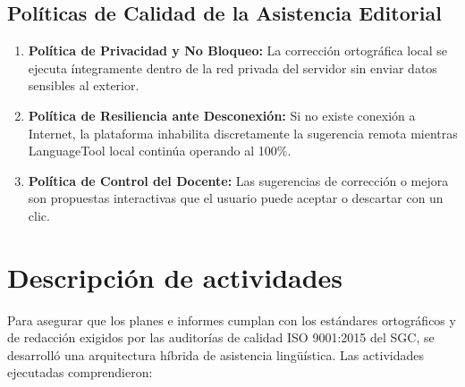 \documentclass[12pt,a4paper]{article}
\begin{document}
\subsection{Políticas de Calidad de la Asistencia Editorial}
\begin{enumerate}[leftmargin=1.5em, itemsep=2pt]
    \item \textbf{Política de Privacidad y No Bloqueo:} La corrección ortográfica local se ejecuta íntegramente dentro de la red privada del servidor sin enviar datos sensibles al exterior.
    \item \textbf{Política de Resiliencia ante Desconexión:} Si no existe conexión a Internet, la plataforma inhabilita discretamente la sugerencia remota mientras LanguageTool local continúa operando al 100\%.
    \item \textbf{Política de Control del Docente:} Las sugerencias de corrección o mejora son propuestas interactivas que el usuario puede aceptar o descartar con un clic.
\end{enumerate}

\section{Descripción de actividades}
Para asegurar que los planes e informes cumplan con los estándares ortográficos y de redacción exigidos por las auditorías de calidad ISO 9001:2015 del SGC, se desarrolló una arquitectura híbrida de asistencia lingüística. Las actividades ejecutadas comprendieron:
\end{document}
